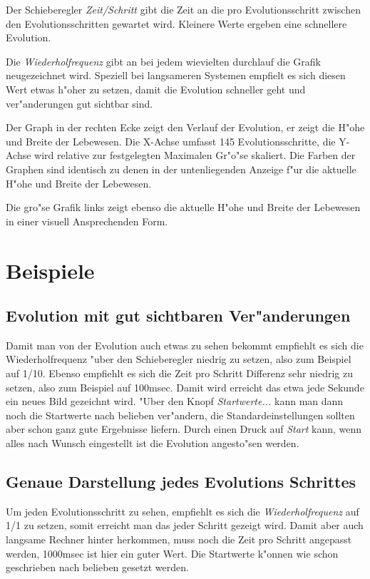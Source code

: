 \documentclass[a4paper]{article}
\begin{document}
Der Schieberegler \emph{Zeit/Schritt} gibt die Zeit an die pro
Evolutionsschritt zwischen den Evolutionsschritten gewartet wird.
Kleinere Werte ergeben eine schnellere Evolution.

Die \emph{Wiederholfrequenz} gibt an bei jedem wievielten durchlauf
die Grafik neugezeichnet wird. Speziell bei langsameren Systemen
empfielt es sich diesen Wert etwas h"oher zu setzen, damit die
Evolution schneller geht und ver"anderungen gut sichtbar sind.

Der Graph in der rechten Ecke zeigt den Verlauf der Evolution, er
zeigt die H"ohe und Breite der Lebewesen. Die X-Achse umfasst 145
Evolutionsschritte, die Y-Achse wird relative zur festgelegten
Maximalen Gr"o"se skaliert. Die Farben der Graphen sind identisch zu
denen in der untenliegenden Anzeige f"ur die aktuelle H"ohe und Breite
der Lebewesen.

Die gro"se Grafik links zeigt ebenso die aktuelle H"ohe und Breite der
Lebewesen in einer visuell Ansprechenden Form. 

\section{Beispiele}

\subsection{Evolution mit gut sichtbaren Ver"anderungen}

Damit man von der Evolution auch etwas zu sehen bekommt empfiehlt es
sich die Wiederholfrequenz "uber den Schieberegler niedrig zu setzen,
also zum Beispiel auf 1/10. Ebenso empfiehlt es sich die Zeit pro
Schritt Differenz sehr niedrig zu setzen, also zum Beispiel auf
100msec. Damit wird erreicht das etwa jede Sekunde ein neues Bild
gezeichnt wird.  "Uber den Knopf \emph{Startwerte...} kann man dann
noch die Startwerte nach belieben ver"andern, die
Standardeinstellungen sollten aber schon ganz gute Ergebnisse liefern.
Durch einen Druck auf \emph{Start} kann, wenn alles nach Wunsch
eingestellt ist die Evolution angesto"sen werden.

\subsection{Genaue Darstellung jedes Evolutions Schrittes}

Um jeden Evolutionsschritt zu sehen, empfiehlt es sich die
\emph{Wiederholfrequenz} auf 1/1 zu setzen, somit erreicht man das
jeder Schritt gezeigt wird. Damit aber auch langsame Rechner hinter
herkommen, muss noch die Zeit pro Schritt angepasst werden, 1000msec
ist hier ein guter Wert. Die Startwerte k"onnen wie schon geschrieben
nach belieben gesetzt werden.
\end{document}
